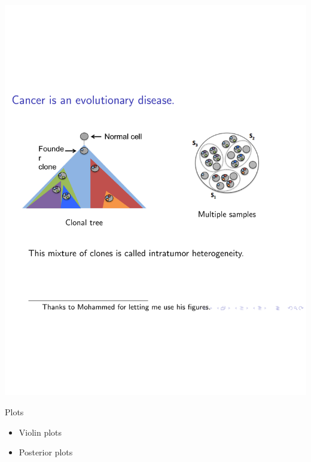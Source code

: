 \documentclass{beamer}
\begin{document}
\begin{frame}
\vspace*{-3.5cm}
\hspace*{-1.17cm}
\includegraphics[page=7, width=\paperwidth]{DDL-UTRA-2016-intro.pdf}
\end{frame}

\begin{frame}{Plots}
\begin{itemize}
	\item Violin plots
	\item Posterior plots
\end{itemize}
\end{frame}
\end{document}

